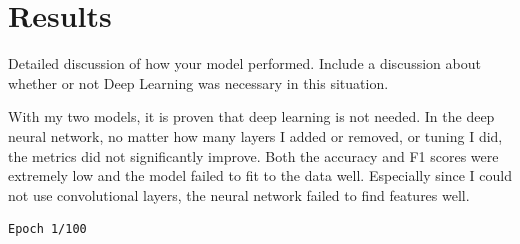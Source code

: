 \documentclass[
  letterpaper,
  DIV=11,
  numbers=noendperiod]{scrartcl}
\begin{document}
\section{Results}\label{results}

Detailed discussion of how your model performed. Include a discussion
about whether or not Deep Learning was necessary in this situation.

With my two models, it is proven that deep learning is not needed. In
the deep neural network, no matter how many layers I added or removed,
or tuning I did, the metrics did not significantly improve. Both the
accuracy and F1 scores were extremely low and the model failed to fit to
the data well. Especially since I could not use convolutional layers,
the neural network failed to find features well.

\begin{verbatim}
Epoch 1/100

\end{verbatim}
\end{document}
